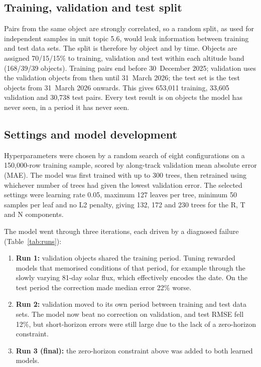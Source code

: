 \documentclass[11pt, a4paper]{article}
\begin{document}
\subsection{Training, validation and test split}

Pairs from the same object are strongly correlated, so a random split, as used for independent samples in unit topic 5.6, would leak information between training and test data sets. The split is therefore by object and by time. Objects are assigned 70/15/15\% to training, validation and test within each altitude band (168/39/39 objects). Training pairs end before 30~December 2025; validation uses the validation objects from then until 31~March 2026; the test set is the test objects from 31~March 2026 onwards. This gives 653,011 training, 33,605 validation and 30,738 test pairs. Every test result is on objects the model has never seen, in a period it has never seen.

\subsection{Settings and model development}

Hyperparameters were chosen by a random search of eight configurations on a 150,000-row training sample, scored by along-track validation mean absolute error (MAE). The model was first trained with up to 300 trees, then retrained using whichever number of trees had given the lowest validation error. The selected settings were learning rate 0.05, maximum 127 leaves per tree, minimum 50 samples per leaf and no L2 penalty, giving 132, 172 and 230 trees for the R, T and N components.

The model went through three iterations, each driven by a diagnosed failure (Table~\ref{tab:runs}):
\begin{enumerate}
\item \textbf{Run 1:} validation objects shared the training period. Tuning rewarded models that memorised conditions of that period, for example through the slowly varying 81-day solar flux, which effectively encodes the date. On the test period the correction made median error 22\% worse.
\item \textbf{Run 2:} validation moved to its own period between training and test data sets. The model now beat no correction on validation, and test RMSE fell 12\%, but short-horizon errors were still large due to the lack of a zero-horizon constraint.
\item \textbf{Run 3 (final):} the zero-horizon constraint above was added to both learned models.
\end{enumerate}
\end{document}
